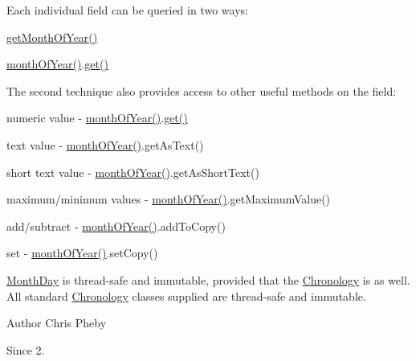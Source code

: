 Each individual field can be queried in two ways\-: 
\begin{DoxyItemize}
\item {\ttfamily \hyperlink{classorg_1_1joda_1_1time_1_1_month_day_a15a20aa5c31fbbf2fa12616b5233b5e5}{get\-Month\-Of\-Year()}} 
\item {\ttfamily \hyperlink{classorg_1_1joda_1_1time_1_1_month_day_a168860baf6a0667446ed82b2c6bf3b41}{month\-Of\-Year()}.\hyperlink{interfaceorg_1_1joda_1_1time_1_1_readable_partial_a5844c779ac1ebd81281466fe2d23547a}{get()}} 
\end{DoxyItemize}The second technique also provides access to other useful methods on the field\-: 
\begin{DoxyItemize}
\item numeric value -\/ {\ttfamily \hyperlink{classorg_1_1joda_1_1time_1_1_month_day_a168860baf6a0667446ed82b2c6bf3b41}{month\-Of\-Year()}.\hyperlink{interfaceorg_1_1joda_1_1time_1_1_readable_partial_a5844c779ac1ebd81281466fe2d23547a}{get()}} 
\item text value -\/ {\ttfamily \hyperlink{classorg_1_1joda_1_1time_1_1_month_day_a168860baf6a0667446ed82b2c6bf3b41}{month\-Of\-Year()}.get\-As\-Text()} 
\item short text value -\/ {\ttfamily \hyperlink{classorg_1_1joda_1_1time_1_1_month_day_a168860baf6a0667446ed82b2c6bf3b41}{month\-Of\-Year()}.get\-As\-Short\-Text()} 
\item maximum/minimum values -\/ {\ttfamily \hyperlink{classorg_1_1joda_1_1time_1_1_month_day_a168860baf6a0667446ed82b2c6bf3b41}{month\-Of\-Year()}.get\-Maximum\-Value()} 
\item add/subtract -\/ {\ttfamily \hyperlink{classorg_1_1joda_1_1time_1_1_month_day_a168860baf6a0667446ed82b2c6bf3b41}{month\-Of\-Year()}.add\-To\-Copy()} 
\item set -\/ {\ttfamily \hyperlink{classorg_1_1joda_1_1time_1_1_month_day_a168860baf6a0667446ed82b2c6bf3b41}{month\-Of\-Year()}.set\-Copy()} 
\end{DoxyItemize}

\hyperlink{classorg_1_1joda_1_1time_1_1_month_day}{Month\-Day} is thread-\/safe and immutable, provided that the \hyperlink{classorg_1_1joda_1_1time_1_1_chronology}{Chronology} is as well. All standard \hyperlink{classorg_1_1joda_1_1time_1_1_chronology}{Chronology} classes supplied are thread-\/safe and immutable.

\begin{DoxyAuthor}{Author}
Chris Pheby 
\end{DoxyAuthor}
\begin{DoxySince}{Since}
2. 
\end{DoxySince}


